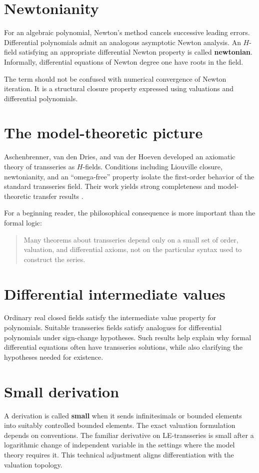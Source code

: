 \documentclass[11pt,openany]{book}
\theoremstyle{plain}
\theoremstyle{definition}
\theoremstyle{remark}
\newcommand{\defterm}[1]{\textbf{#1}}
\begin{document}
\section{Newtonianity}
For an algebraic polynomial, Newton's method cancels successive leading errors. Differential polynomials admit an analogous asymptotic Newton analysis. An $H$-field satisfying an appropriate differential Newton property is called \defterm{newtonian}. Informally, differential equations of Newton degree one have roots in the field.

The term should not be confused with numerical convergence of Newton iteration. It is a structural closure property expressed using valuations and differential polynomials.

\section{The model-theoretic picture}
Aschenbrenner, van den Dries, and van der Hoeven developed an axiomatic theory of transseries as $H$-fields. Conditions including Liouville closure, newtonianity, and an ``omega-free'' property isolate the first-order behavior of the standard transseries field. Their work yields strong completeness and model-theoretic transfer results \cite{ADH2017,ADH2018}.

For a beginning reader, the philosophical consequence is more important than the formal logic:
\begin{quote}
Many theorems about transseries depend only on a small set of order, valuation, and differential axioms, not on the particular syntax used to construct the series.
\end{quote}

\section{Differential intermediate values}
Ordinary real closed fields satisfy the intermediate value property for polynomials. Suitable transseries fields satisfy analogues for differential polynomials under sign-change hypotheses. Such results help explain why formal differential equations often have transseries solutions, while also clarifying the hypotheses needed for existence.

\section{Small derivation}
A derivation is called \defterm{small} when it sends infinitesimals or bounded elements into suitably controlled bounded elements. The exact valuation formulation depends on conventions. The familiar derivative on LE-transseries is small after a logarithmic change of independent variable in the settings where the model theory requires it. This technical adjustment aligns differentiation with the valuation topology.
\end{document}
